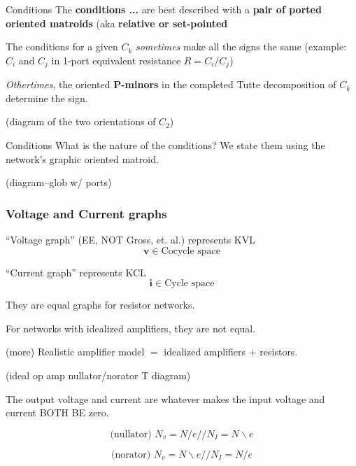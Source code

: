 \documentclass{beamer}
\begin{document}
\begin{frame}{Conditions}
The \textbf{conditions ...} are best described with 
a \textbf{pair of ported oriented matroids}
(aka \textbf{relative or set-pointed}

The conditions for a given $C_k$ \textit{sometimes}
make all the signs the same (example: $C_i$ and 
$C_j$ in 1-port equivalent resistance $R=C_i/C_j$)

\textit{Othertimes}, the oriented \textbf{P-minors}
in the completed Tutte decomposition of $C_k$ determine
the sign.

(diagram of the two orientations of $C_2$)

\end{frame}

\begin{frame}{Conditions}
What is the nature of the conditions?  We state them using the 
network's graphic oriented matroid.

(diagram--glob w/ ports)

\end{frame}





\begin{frame}
\frametitle{Voltage and Current graphs}

\begin{minipage}{0.4\textwidth}
``Voltage graph'' (EE, NOT Gross, et. al.) represents KVL
\[\mathbf{v}\in \text{Cocycle space}\]
\end{minipage}
\begin{minipage}{0.4\textwidth}
``Current graph'' represents KCL
\[\mathbf{i}\in \text{Cycle space}\]
\end{minipage}
They are equal graphs for resistor networks.

For networks with idealized amplifiers, they are not 
equal.  

(more) Realistic amplifier model $=$ idealized amplifiers $+$ 
resistors.

(ideal op amp nullator/norator T diagram)

The output voltage and current are whatever makes the input
voltage and current BOTH BE zero.

\begin{minipage}{0.4\textwidth}
\[
\text{(nullator)\ }N_v = N/e// 
N_I = N\backslash e
\]
\end{minipage}
\begin{minipage}{0.4\textwidth}
\[
\text{(norator)\ }N_v = N\backslash e// 
N_I = N/e
\]
\end{minipage}

\end{frame}
\end{document}
